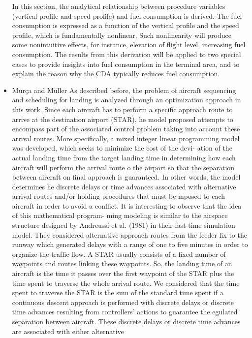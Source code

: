 \documentclass{aer1315-pretty}
\begin{document}
\begin{itemize}
   In this section, the analytical relationship between procedure
variables (vertical profile and speed profile) and fuel consumption
is derived. The fuel consumption is expressed as a function of
the vertical profile and the speed profile, which is fundamentally
nonlinear. Such nonlinearity will produce some nonintuitive effects,
for instance, elevation of flight level, increasing fuel consumption.
The results from this derivation will be applied to two special cases to
provide insights into fuel consumption in the terminal area, and to
explain the reason why the CDA typically reduces fuel consumption.




\item Mur\c{c}a and M{\"u}ller \cite{Murca:2015}
    As described before, the problem of aircraft sequencing and scheduling for landing is analyzed through an optimization
approach in this work. Since each aircraft has to perform a speciﬁc approach route to arrive at the destination airport (STAR),
 he model proposed attempts to encompass part of the associated control problem taking into account these arrival routes.
More speciﬁcally, a mixed integer linear programming model was developed, which seeks to minimize the cost of the devi-
ation of the actual landing time from the target landing time in determining how each aircraft will perform the arrival route
 o the airport so that the separation between aircraft on ﬁnal approach is guaranteed. In other words, the model determines
 he discrete delays or time advances associated with alternative arrival routes and/or holding procedures that must be
 mposed to each aircraft in order to avoid a conﬂict. It is interesting to observe that the idea of this mathematical program-
ming modeling is similar to the airspace structure designed by Andreussi et al. (1981) in their fast-time simulation model.
They considered alternative approach routes from the feeder ﬁx to the runway which generated delays with a range of one to
ﬁve minutes in order to organize the trafﬁc ﬂow.
    A STAR usually consists of a ﬁxed number of waypoints and routes linking these waypoints. So, the landing time of an
aircraft is the time it passes over the ﬁrst waypoint of the STAR plus the time spent to traverse the whole arrival route.
We considered that the time spent to traverse the STAR is the sum of the standard time spent if a continuous descent
approach is performed with discrete delays or discrete time advances resulting from controllers’ actions to guarantee the
 egulated separation between aircraft. These discrete delays or discrete time advances are associated with either alternative

\end{itemize}
\end{document}
